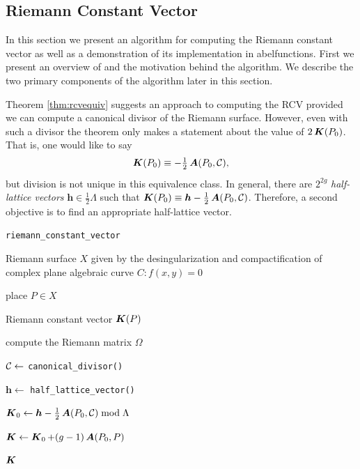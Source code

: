 \subsection{Riemann Constant
  Vector}\label{subsec:abelfunctions-riemann-constant-vector}

In this section we present an algorithm for computing the Riemann constant
vector as well as a demonstration of its implementation in {\sc abelfunctions}.
First we present an overview of and the motivation behind the algorithm. We
describe the two primary components of the algorithm later in this section.

Theorem \ref{thm:rcvequiv} suggests an approach to computing the RCV provided we
can compute a canonical divisor of the Riemann surface. However, even with such
a divisor the theorem only makes a statement about the value of $2\operatorname{\boldsymbol{K}}(P_0)$.
That is, one would like to say
\begin{equation}
  \operatorname{\boldsymbol{K}}(P_0) \equiv - \tfrac{1}{2} \operatorname{\boldsymbol{A}}(P_0,\operatorname{\mathcal{C}}),
\end{equation}
but division is not unique in this equivalence class. In general, there are
$2^{2g}$ {\it half-lattice vectors} $\boldsymbol{h} \in \tfrac{1}{2}\Lambda$
such that $\operatorname{\boldsymbol{K}}(P_0) \equiv \boldsymbol{h} - \tfrac{1}{2}\operatorname{\boldsymbol{A}}(P_0,\operatorname{\mathcal{C}})$.
Therefore, a second objective is to find an appropriate half-lattice vector.

\begin{algorithm}[H]
\caption{\tt riemann\_constant\_vector}
\label{alg:rcv}
\begin{algorithmic}[1]
  \Require Riemann surface $X$ given by the desingularization and
  compactification of complex plane algebraic curve $C : f(x,y) = 0$

  \Require place $P \in X$

  \Ensure Riemann constant vector $\operatorname{\boldsymbol{K}}(P)$

  \State compute the Riemann matrix $\Omega$

  \State $\operatorname{\mathcal{C}} \gets$ \verb=canonical_divisor()=

  \State $\boldsymbol{h} \gets$ \verb=half_lattice_vector()=

  \State $\operatorname{\boldsymbol{K}}_0 \gets \boldsymbol{h} - \tfrac{1}{2}\operatorname{\boldsymbol{A}}(P_0,\operatorname{\mathcal{C}})
  \bmod{\Lambda}$

  \State $\operatorname{\boldsymbol{K}} \gets \operatorname{\boldsymbol{K}}_0 + (g-1)\operatorname{\boldsymbol{A}}(P_0,P)$

  \State \Return $\operatorname{\boldsymbol{K}}$
\end{algorithmic}
\end{algorithm}

